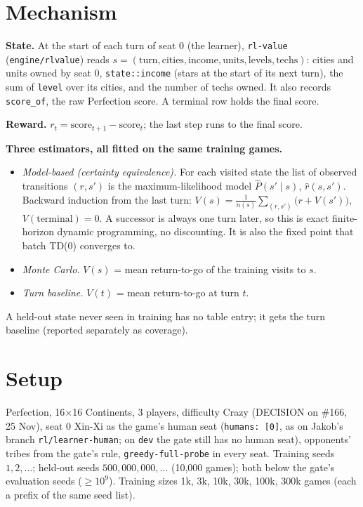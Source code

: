 \documentclass{../polyexp}
\begin{document}
\section{Mechanism}
\textbf{State.} At the start of each turn of seat 0 (the learner), \texttt{rl-value} (\texttt{engine/rlvalue})
reads $s = (\text{turn}, \text{cities}, \text{income}, \text{units}, \text{levels}, \text{techs})$:
cities and units owned by seat 0, \texttt{state::income} (stars at the start of its next turn), the sum of
\texttt{level} over its cities, and the number of techs owned. It also records \texttt{score\_of}, the raw
Perfection score. A terminal row holds the final score.

\textbf{Reward.} $r_t = \text{score}_{t+1} - \text{score}_t$; the last step runs to the final score.

\textbf{Three estimators, all fitted on the same training games.}
\begin{itemize}
  \item \emph{Model-based (certainty equivalence).} For each visited state the list of observed transitions
        $(r, s')$ is the maximum-likelihood model $\hat P(s'\mid s)$, $\hat r(s,s')$. Backward induction from the
        last turn: $V(s) = \frac{1}{n(s)} \sum_{(r,s')} \bigl(r + V(s')\bigr)$, $V(\text{terminal}) = 0$. A
        successor is always one turn later, so this is exact finite-horizon dynamic programming, no
        discounting. It is also the fixed point that batch TD(0) converges to.
  \item \emph{Monte Carlo.} $V(s)$ = mean return-to-go of the training visits to $s$.
  \item \emph{Turn baseline.} $V(t)$ = mean return-to-go at turn $t$.
\end{itemize}
A held-out state never seen in training has no table entry; it gets the turn baseline (reported separately as
coverage).

\section{Setup}
Perfection, 16$\times$16 Continents, 3 players, difficulty Crazy (DECISION on \#166, 25 Nov), seat 0 Xin-Xi as
the game's human seat (\texttt{humans: [0]}, as on Jakob's branch \texttt{rl/learner-human}; on \texttt{dev}
the gate still has no human seat), opponents' tribes from the gate's rule, \texttt{greedy-full-probe} in every
seat. Training seeds $1, 2, \dots$; held-out seeds $500{,}000{,}000, \dots$ (10{,}000 games); both below the
gate's evaluation seeds ($\geq 10^9$). Training sizes 1k, 3k, 10k, 30k, 100k, 300k games (each a prefix of the
same seed list).
\end{document}
